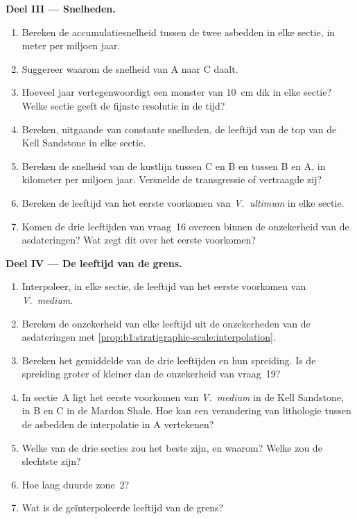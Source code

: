 \begin{problem}
\noindent\textbf{Deel III --- Snelheden.}
\begin{enumerate}[resume]
  \item Bereken de accumulatiesnelheid tussen de twee asbedden in elke sectie, in meter per miljoen jaar.
  \item Suggereer waarom de snelheid van A naar C daalt.
  \item Hoeveel jaar vertegenwoordigt een monster van \qty{10}{cm} dik in elke sectie? Welke sectie geeft de fijnste resolutie in de tijd?
  \item Bereken, uitgaande van constante snelheden, de leeftijd van de top van de Kell Sandstone in elke sectie.
  \item Bereken de snelheid van de kustlijn tussen C en B en tussen B en A, in kilometer per miljoen jaar. Versnelde de transgressie of vertraagde zij?
  \item Bereken de leeftijd van het eerste voorkomen van \emph{V.~ultimum} in elke sectie.
  \item Komen de drie leeftijden van vraag~16 overeen binnen de onzekerheid van de asdateringen? Wat zegt dit over het eerste voorkomen?
\end{enumerate}

\noindent\textbf{Deel IV --- De leeftijd van de grens.}
\begin{enumerate}[resume]
  \item Interpoleer, in elke sectie, de leeftijd van het eerste voorkomen van \emph{V.~medium}.
  \item Bereken de onzekerheid van elke leeftijd uit de onzekerheden van de asdateringen met \cref{prop:b1:stratigraphic-scale:interpolation}.
  \item Bereken het gemiddelde van de drie leeftijden en hun spreiding. Is de spreiding groter of kleiner dan de onzekerheid van vraag~19?
  \item In sectie~A ligt het eerste voorkomen van \emph{V.~medium} in de Kell Sandstone, in B en C in de Mardon Shale. Hoe kan een verandering van lithologie tussen de asbedden de interpolatie in A vertekenen?
  \item Welke van de drie secties zou het beste  zijn, en waarom? Welke zou de slechtste zijn?
  \item Hoe lang duurde zone~2?
  \item Wat is de geïnterpoleerde leeftijd van de grens?
\end{enumerate}
\end{problem}
